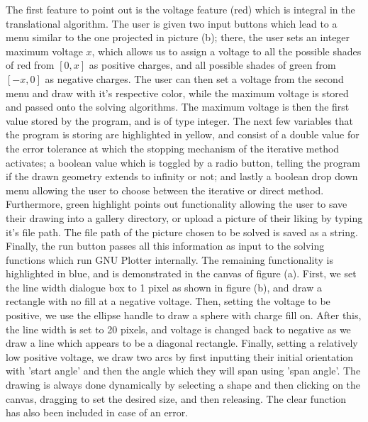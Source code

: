 \documentclass[a4paper]{article}
\begin{document}
\noindent
The first feature to point out is the voltage feature (red) which is integral in the translational algorithm. The user is given two input buttons which lead to a menu similar to the one projected in picture (b); there, the user sets an integer maximum voltage $x$, which allows us to assign a voltage to all the possible shades of red from $[0,x]$ as positive charges, and all possible shades of green  from $[-x,0]$ as negative charges. The user can then set a voltage from the second menu and draw with it's respective color, while the maximum voltage is stored and passed onto the solving algorithms.\newline
\linebreak
\noindent
The maximum voltage is then the first value stored by the program, and is of type integer. The next few variables that the program is storing are highlighted in yellow, and consist of a double value for the error tolerance at which the stopping mechanism of the iterative method activates; a boolean value which is toggled by a radio button, telling the program if the drawn geometry extends to infinity or not; and lastly a boolean  drop down menu allowing the user to choose between the iterative or direct method. Furthermore, green highlight points out functionality allowing the user to save their drawing into a gallery directory, or upload a picture of their liking by typing it's file path. The file path of the picture chosen to be solved is saved as a string. Finally, the run button passes all this information as input to the solving functions which run GNU Plotter internally.\newline
\linebreak
\noindent
The remaining functionality is highlighted in blue, and is demonstrated in the canvas of figure (a). First, we set the line width dialogue box to 1 pixel as shown in figure (b), and draw a rectangle with no fill at a negative voltage. Then, setting the voltage to be positive, we use the ellipse handle to draw a sphere with charge fill on. After this, the line width is set to 20 pixels, and voltage is changed back to negative as we draw a line which appears to be a diagonal rectangle. Finally, setting a relatively low positive voltage, we draw two arcs by first inputting their initial orientation with 'start angle' and then the angle which they will span using 'span angle'. The drawing is always done dynamically by selecting a shape and then clicking on the canvas, dragging to set the desired size, and then releasing. The clear function has also been included in case of an error.
\end{document}
